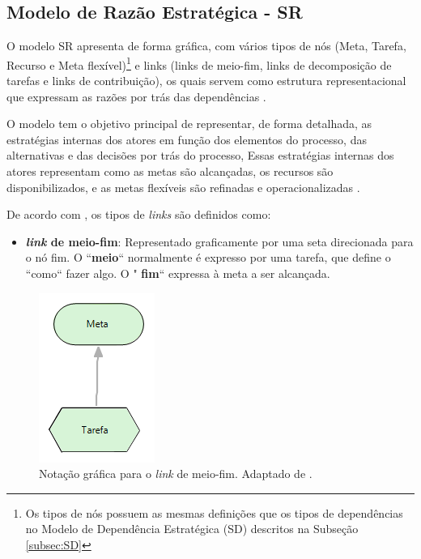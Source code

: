 \subsection{Modelo de Razão Estratégica - SR}
\label{subsec:SR}

O modelo SR apresenta de forma gráfica, com vários tipos de nós (Meta, Tarefa, Recurso e Meta flexível)\footnote[1]{Os tipos de nós possuem as mesmas definições que os tipos de dependências no Modelo de Dependência Estratégica (SD) descritos na Subseção \ref{subsec:SD}} e links (links de meio-fim, links de decomposição de tarefas e links de contribuição), os quais servem como estrutura representacional que expressam as razões por trás das dependências \cite{istarwiki20}.

O modelo tem o objetivo principal de representar, de forma detalhada, as estratégias internas dos atores em função dos elementos do processo, das alternativas e das decisões por trás do processo, Essas estratégias internas dos atores representam como as metas são alcançadas, os recursos são disponibilizados, e as metas flexíveis são refinadas e operacionalizadas \cite{napolitano2009estrategia}.  

De acordo com \cite{istarwiki20}, os tipos de \textit{links} são definidos como: 

\pagebreak

\begin{itemize}
	
	\item \textbf{\textit{link} de meio-fim}: Representado graficamente por uma seta direcionada para o nó fim. O ``\textbf{meio}`` normalmente é expresso por uma tarefa, que define o ``como`` fazer algo. O " \textbf{fim}`` expressa à meta a ser alcançada.
\end{itemize}

\begin{figure}[h!]
	\centering
	\includegraphics[keepaspectratio=true,scale=0.9]{figuras/meioFim.PNG}
	\caption{Notação gráfica para o \textit{link} de meio-fim. Adaptado de \cite{istarwiki20}.}
	\label{meiofim}
\end{figure} 

